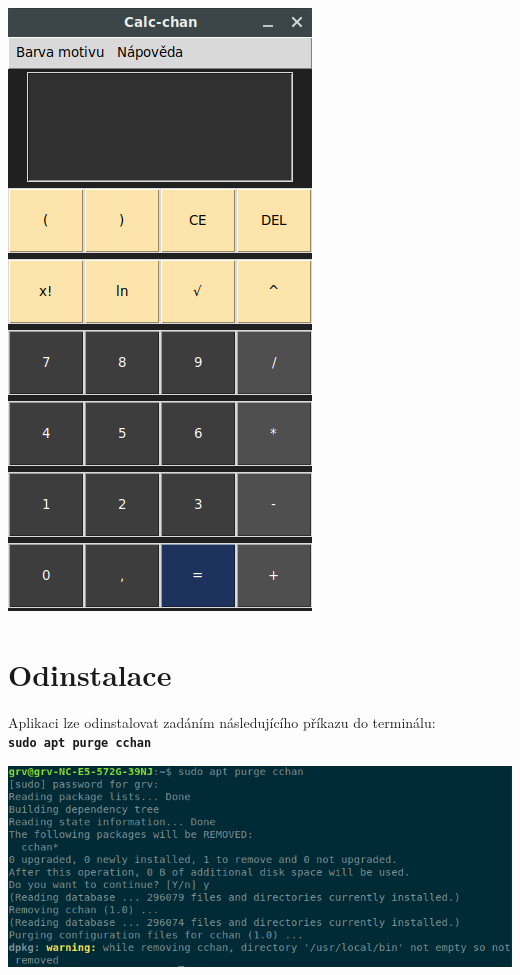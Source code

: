 \documentclass[a4paper, 11pt]{article}
\begin{document}
\begin{center}
\includegraphics[scale=0.5]{screenshot2.png}
\end{center}

\section{Odinstalace}
Aplikaci lze odinstalovat zadáním následujícího příkazu do terminálu:\\
\texttt{\textbf{sudo apt purge cchan}}\\
\begin{center}
\includegraphics[scale=0.65]{purge.png}
\end{center}
\end{document}
